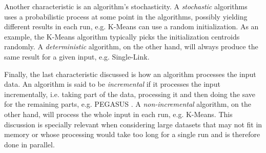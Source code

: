 Another characteristic is an algorithm's stochasticity.
A \emph{stochastic} algorithms uses a probabilistic process at some point in the algorithms, possibly yielding different results in each run, e.g. K-Means can use a random initialization.
As an example, the K-Means algorithm typically picks the initialization centroids randomly.
A \emph{deterministic} algorithm, on the other hand, will always produce the same result for a given input, e.g. Single-Link.

Finally, the last characteristic discussed is how an algorithm processes the input data.
An algorithm is said to be \emph{incremental} if it processes the input incrementally, i.e. taking part of the data, processing it and then doing the save for the remaining parts, e.g. PEGASUS \cite{Kang2011}.
A \emph{non-incremental} algorithm, on the other hand, will process the whole input in each run, e.g. K-Means.
This discussion is specially relevant when considering large datasets that may not fit in memory or whose processing would take too long for a single run and is therefore done in parallel.








